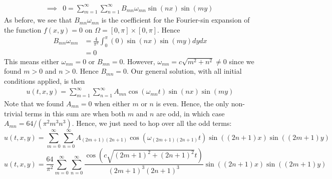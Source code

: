 \documentclass[12pt]{article}
\begin{document}
{\begin{align*}
\implies& 0 = \sum_{m = 1}^{\infty} \sum_{n = 1}^{\infty} B_{mn} \omega_{mn} \sin(nx) \sin(my)
\end{align*}
As before, we see that $B_{mn} \omega_{mn}$ is the coefficient for the Fourier-sin expansion of the function $f(x,y)=0$ on $\Omega = [0,\pi] \times [0, \pi]$. Hence
\begin{align*}
B_{mn} \omega_{mn} &= \frac{4}{\pi^2} \int_0^{\pi} (0) \sin(nx) \sin(my) dy dx \\
&= 0
\end{align*}
This means either $\omega_{mn} = 0$ or $B_{mn} = 0$. However, $\omega_{mn} = c \sqrt{m^2 + n^2} \neq 0$ since we found $m > 0$ and $n > 0$. Hence $B_{mn} = 0$. Our general solution, with all initial conditions applied, is then
\begin{align*}
u(t,x,y) = \sum_{m = 1}^{\infty} \sum_{n = 1}^{\infty} A_{mn} \cos \left(\omega_{mn} t \right) \sin(nx) \sin(my)
\end{align*}
Note that we found $A_{mn} = 0$ when either $m$ or $n$ is even. Hence, the only non-trivial terms in this sum are when both $m$ and $n$ are odd, in which case $A_{mn} = 64 / (\pi^2 m^3 n^3)$. Hence, we just need to hop over all the odd terms:
$$u(t,x,y) = \sum_{m = 0}^{\infty} \sum_{n = 0}^{\infty} A_{(2m + 1)(2n+1)} \cos \left(\omega_{(2m+1)(2n+1)} t \right) \sin((2n+1)x) \sin((2m+1)y)$$
$$\boxed{u(t,x,y) =  \frac{64}{\pi^2} \sum_{m = 0}^{\infty} \sum_{n = 0}^{\infty} \frac{\cos \left( c \sqrt{(2m+1)^2 + (2n+1)^2} t \right) }{(2m+1)^3(2n+1)^3} \sin((2n+1)x) \sin((2m+1)y)}$$
}
\end{document}
